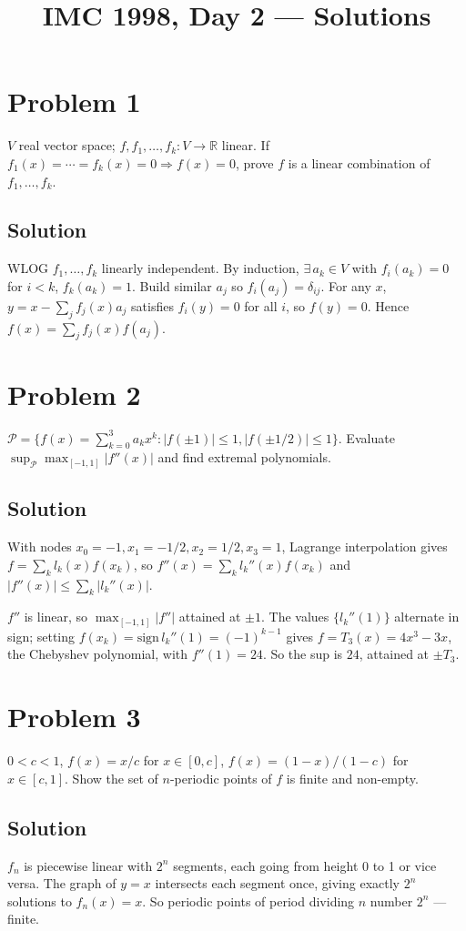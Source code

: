 \documentclass{article}
\title{IMC 1998, Day 2 --- Solutions}
\begin{document}
\maketitle

\section*{Problem 1}
$V$ real vector space; $f, f_1,\dots,f_k: V\to\mathbb{R}$ linear. If $f_1(x)=\cdots=f_k(x)=0 \Rightarrow f(x)=0$, prove $f$ is a linear combination of $f_1,\dots,f_k$.

\subsection*{Solution}
WLOG $f_1,\dots,f_k$ linearly independent. By induction, $\exists\, a_k\in V$ with $f_i(a_k)=0$ for $i<k$, $f_k(a_k)=1$. Build similar $a_j$ so $f_i(a_j)=\delta_{ij}$. For any $x$, $y = x - \sum_j f_j(x) a_j$ satisfies $f_i(y)=0$ for all $i$, so $f(y)=0$. Hence $f(x) = \sum_j f_j(x) f(a_j)$.

\section*{Problem 2}
$\mathcal P = \{f(x) = \sum_{k=0}^3 a_k x^k : |f(\pm 1)|\le 1, |f(\pm 1/2)|\le 1\}$. Evaluate $\sup_{\mathcal P}\max_{[-1,1]}|f''(x)|$ and find extremal polynomials.

\subsection*{Solution}
With nodes $x_0=-1, x_1=-1/2, x_2=1/2, x_3=1$, Lagrange interpolation gives $f = \sum_k l_k(x) f(x_k)$, so $f''(x) = \sum_k l_k''(x) f(x_k)$ and $|f''(x)|\le \sum_k |l_k''(x)|$.

$f''$ is linear, so $\max_{[-1,1]}|f''|$ attained at $\pm 1$. The values $\{l_k''(1)\}$ alternate in sign; setting $f(x_k) = \mathrm{sign}\,l_k''(1) = (-1)^{k-1}$ gives $f = T_3(x) = 4x^3 - 3x$, the Chebyshev polynomial, with $f''(1)=24$. So the sup is $24$, attained at $\pm T_3$.

\section*{Problem 3}
$0<c<1$, $f(x)=x/c$ for $x\in[0,c]$, $f(x)=(1-x)/(1-c)$ for $x\in[c,1]$. Show the set of $n$-periodic points of $f$ is finite and non-empty.

\subsection*{Solution}
$f_n$ is piecewise linear with $2^n$ segments, each going from height 0 to 1 or vice versa. The graph of $y=x$ intersects each segment once, giving exactly $2^n$ solutions to $f_n(x)=x$. So periodic points of period dividing $n$ number $2^n$ — finite.
\end{document}
